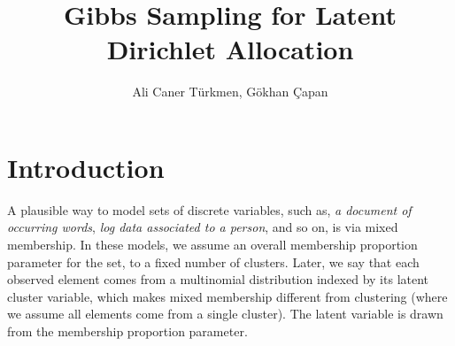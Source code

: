 \documentclass{article}%
\begin{document}
\title{Gibbs Sampling for Latent Dirichlet Allocation}

\author{Ali Caner T\" urkmen, G\" okhan \c Capan}
\date{}

\maketitle

\section{Introduction}
A plausible way to model sets of discrete variables, such as, \textit{a document of occurring words}, \textit{log data associated to a person}, and so on, is via mixed membership. In these models, we assume an overall membership proportion parameter for the set, to a fixed number of clusters. Later, we say that each observed element comes from a multinomial distribution indexed by its latent cluster variable, which makes mixed membership different from clustering (where we assume all elements come from a single cluster). The latent variable is drawn from the membership proportion parameter.
\end{document}
